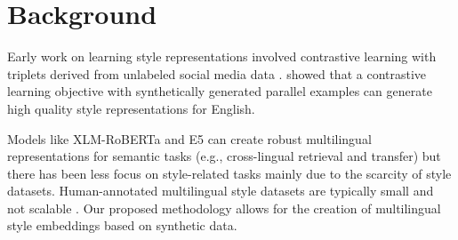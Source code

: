 \section{Background}
\label{sec:relatedwork}


Early work on learning style representations %
involved contrastive learning with triplets derived from unlabeled social media data \citep{deepstyle, styleemb, luar, lisa}. \citet{patel2024styledistancestrongercontentindependentstyle} showed that a contrastive learning objective with synthetically generated parallel examples can generate high quality style representations for English. 

Models like XLM-RoBERTa \citep{Conneau2019UnsupervisedCR} and E5 \citep{wang2024multilinguale5textembeddings} can create robust multilingual representations for semantic tasks (e.g., cross-lingual retrieval and transfer) but there has been less focus on style-related tasks mainly due to the scarcity of style datasets. %
Human-annotated multilingual %
style datasets are typically small and not scalable \citep{mukherjee2024multilingualtextstyletransfer, briakou-etal-2021-ola, dementieva2024overview, ryan-etal-2023-revisiting}. Our proposed methodology allows for the creation of multilingual style embeddings based on synthetic data. 

